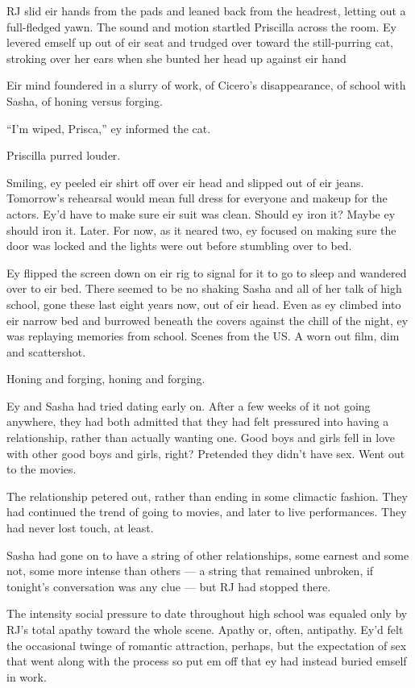 RJ slid eir hands from the pads and leaned back from the headrest, letting out a full-fledged yawn. The sound and motion startled Priscilla across the room. Ey levered emself up out of eir seat and trudged over toward the still-purring cat, stroking over her ears when she bunted her head up against eir hand

Eir mind foundered in a slurry of work, of Cicero's disappearance, of school with Sasha, of honing versus forging.

``I'm wiped, Prisca,'' ey informed the cat.

Priscilla purred louder.

Smiling, ey peeled eir shirt off over eir head and slipped out of eir jeans. Tomorrow's rehearsal would mean full dress for everyone and makeup for the actors. Ey'd have to make sure eir suit was clean. Should ey iron it? Maybe ey should iron it. Later. For now, as it neared two, ey focused on making sure the door was locked and the lights were out before stumbling over to bed.

Ey flipped the screen down on eir rig to signal for it to go to sleep and wandered over to eir bed. There seemed to be no shaking Sasha and all of her talk of high school, gone these last eight years now, out of eir head. Even as ey climbed into eir narrow bed and burrowed beneath the covers against the chill of the night, ey was replaying memories from school. Scenes from the US. A worn out film, dim and scattershot.

Honing and forging, honing and forging.

Ey and Sasha had tried dating early on. After a few weeks of it not going anywhere, they had both admitted that they had felt pressured into having a relationship, rather than actually wanting one. Good boys and girls fell in love with other good boys and girls, right? Pretended they didn't have sex. Went out to the movies.

The relationship petered out, rather than ending in some climactic fashion. They had continued the trend of going to movies, and later to live performances. They had never lost touch, at least.

Sasha had gone on to have a string of other relationships, some earnest and some not, some more intense than others --- a string that remained unbroken, if tonight's conversation was any clue --- but RJ had stopped there.

The intensity social pressure to date throughout high school was equaled only by RJ's total apathy toward the whole scene. Apathy or, often, antipathy. Ey'd felt the occasional twinge of romantic attraction, perhaps, but the expectation of sex that went along with the process so put em off that ey had instead buried emself in work.

